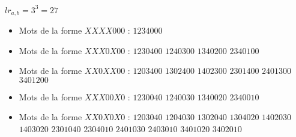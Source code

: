 \begin{example}[Théorème 9 : $a = 4, b = 3$]
    $lr_{a,b} = 3^3 = 27$
    \begin{itemize}
        \item Mots de la forme $XXXX000$ :
            \subitem $1234000$
        \item Mots de la forme $XXX0X00$ :
            \subitem $1230400$
            \hspace{2cm} $1240300$
            \hspace{2cm} $1340200$
            \subitem $2340100$
        \item Mots de la forme $XX0XX00$ :
            \subitem $1203400$
            \hspace{2cm} $1302400$
            \hspace{2cm} $1402300$
            \subitem $2301400$
            \hspace{2cm} $2401300$
            \hspace{2cm} $3401200$
        \item Mots de la forme $XXX00X0$ :
            \subitem $1230040$
            \hspace{2cm} $1240030$
            \hspace{2cm} $1340020$
            \subitem $2340010$
        \item Mots de la forme $XX0X0X0$ :
            \subitem $1203040$
            \hspace{2cm} $1204030$
            \hspace{2cm} $1302040$
            \subitem $1304020$
            \hspace{2cm} $1402030$
            \hspace{2cm} $1403020$
            \subitem $2301040$
            \hspace{2cm} $2304010$
            \hspace{2cm} $2401030$
            \subitem $2403010$
            \hspace{2cm} $3401020$
            \hspace{2cm} $3402010$
    \end{itemize}
    
\end{example}